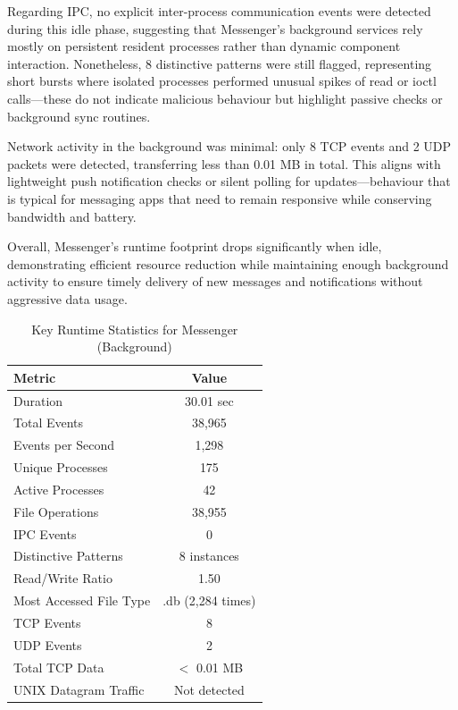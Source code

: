 \documentclass[a4paper,12pt]{report}
\begin{document}
Regarding IPC, no explicit inter-process communication events were detected during this idle phase, suggesting that Messenger’s background services rely mostly on persistent resident processes rather than dynamic component interaction. Nonetheless, 8 distinctive patterns were still flagged, representing short bursts where isolated processes performed unusual spikes of read or ioctl calls—these do not indicate malicious behaviour but highlight passive checks or background sync routines.

Network activity in the background was minimal: only 8 TCP events and 2 UDP packets were detected, transferring less than 0.01 MB in total. This aligns with lightweight push notification checks or silent polling for updates—behaviour that is typical for messaging apps that need to remain responsive while conserving bandwidth and battery.

Overall, Messenger’s runtime footprint drops significantly when idle, demonstrating efficient resource reduction while maintaining enough background activity to ensure timely delivery of new messages and notifications without aggressive data usage.

\begin{table}[H]
    \centering
    \caption{Key Runtime Statistics for Messenger (Background)}
    \label{tab:messenger_background_stats}
    \begin{tabular}{|l|c|}
        \hline
        \textbf{Metric} & \textbf{Value} \\
        \hline
        Duration & 30.01 sec \\
        Total Events & 38,965 \\
        Events per Second & 1,298 \\
        Unique Processes & 175 \\
        Active Processes & 42 \\
        File Operations & 38,955 \\
        IPC Events & 0 \\
        Distinctive Patterns & 8 instances \\
        Read/Write Ratio & 1.50 \\
        Most Accessed File Type & .db (2,284 times) \\
        TCP Events & 8 \\
        UDP Events & 2 \\
        Total TCP Data & $<$ 0.01 MB \\
        UNIX Datagram Traffic & Not detected \\
        \hline
    \end{tabular}
\end{table}
\end{document}
